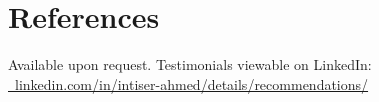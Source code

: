 \documentclass[10pt,letterpaper]{article} %
\newcommand{\linkedInUserName}{intiser-ahmed}
\begin{document}
\section*{References} %
Available upon request. Testimonials viewable on LinkedIn: \href{https://www.linkedin.com/in/intiser-ahmed/details/recommendations/}{\faLinkedin~linkedin.com/in/\linkedInUserName/details/recommendations/}
\end{document}
